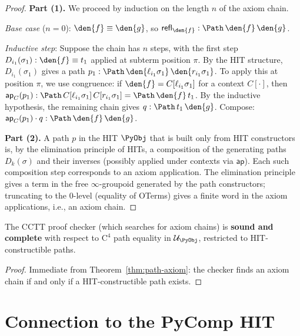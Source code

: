 \begin{proof}
\textbf{Part (1).}  We proceed by induction on the length $n$ of the
axiom chain.

\emph{Base case} ($n = 0$): $\den{f} \equiv \den{g}$, so
$\mathsf{refl}_{\den{f}} : \Path\, \den{f}\, \den{g}$.

\emph{Inductive step}: Suppose the chain has $n$ steps, with the
first step $D_{i_1}(\sigma_1) : \den{f} \equiv t_1$ applied at subterm
position $\pi$.  By the HIT structure, $D_{i_1}(\sigma_1)$ gives a
path $p_1 : \Path\, \den{\ell_{i_1}\sigma_1}\, \den{r_{i_1}\sigma_1}$.
To apply this at position $\pi$, we use congruence: if $\den{f} =
C[\ell_{i_1}\sigma_1]$ for a context $C[\cdot]$, then
$\mathsf{ap}_{C}(p_1) : \Path\, C[\ell_{i_1}\sigma_1]\,
C[r_{i_1}\sigma_1] = \Path\, \den{f}\, t_1$.  By the inductive
hypothesis, the remaining chain gives $q : \Path\, t_1\, \den{g}$.
Compose: $\mathsf{ap}_C(p_1) \cdot q : \Path\, \den{f}\, \den{g}$.

\textbf{Part (2).}  A path $p$ in the HIT $\PyObj$ that is built only
from HIT constructors is, by the elimination principle of HITs, a
composition of the generating paths $D_k(\sigma)$ and their inverses
(possibly applied under contexts via $\mathsf{ap}$).  Each such
composition step corresponds to an axiom application.  The elimination
principle gives a term in the free $\infty$-groupoid generated by the
path constructors; truncating to the 0-level (equality of OTerms)
gives a finite word in the axiom applications, i.e., an axiom chain.
\end{proof}

\begin{corollary}
The CCTT proof checker (which searches for axiom chains) is
\textbf{sound and complete} with respect to $\mathrm{C}^4$ path
equality in $\mathcal{U}_\PyObj$, restricted to HIT-constructible
paths.
\end{corollary}

\begin{proof}
Immediate from Theorem~\ref{thm:path-axiom}: the checker finds an
axiom chain if and only if a HIT-constructible path exists.
\end{proof}


\section{Connection to the PyComp HIT}
\label{sec:pycomp-hit}

